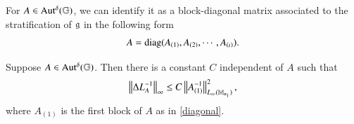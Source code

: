 \documentclass[leqno]{amsart}
\begin{document}
	For $A\in{\rm Aut^{\delta}}(\mathbb{G})$, we can identify it as a block-diagonal matrix associated to the stratification of $\mathfrak{g}$ in the following form
	\begin{align}\label{diagonal}
		A={\rm diag}(A_{(1)},A_{(2)},\cdots,A_{(\iota)}).
	\end{align}	
	\begin{lemma}\label{laplacianbdd}
		Suppose $A\in{\rm Aut^{\delta}}(\mathbb{G})$. Then there is a constant $C$ independent of $A$ such that
		\begin{align*}
			\left\| \Delta L_{A}^{-1} \right\|_{\infty}\leq C \left\| A_{(1)}^{-1} \right\|_{L_{\infty}(\mathbb{M}_{n_{1}})}^{2},
		\end{align*}
		where $A_{(1)}$ is the first block of $A$ as in \eqref{diagonal}.
	\end{lemma}
\end{document}
